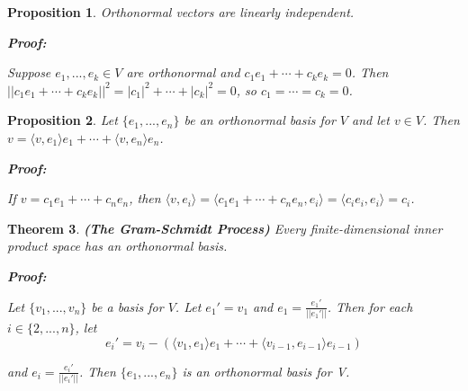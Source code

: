 \documentclass{article}
\theoremstyle{colontheorem}
\newtheorem{theorem}{Theorem}[section]
\newtheorem{proposition}[theorem]{Proposition}
\newenvironment{Theorem}
{
	\begin{mdframed}[backgroundcolor=TheoremOrange!10]
	\begin{theorem}
}
{
	\end{theorem}
	\end{mdframed}
	
	\vspace{.15in}
}
\newenvironment{Proposition}
{
	\begin{mdframed}[backgroundcolor=TheoremOrange!10]
	\begin{proposition}
}
{
	\end{proposition}
	\end{mdframed}
	
	\vspace{.15in}
}
\newenvironment{Proof}
{
	\begin{mdframed}[backgroundcolor=ProofPurple!10]
	\textbf{Proof:}%
}
{
	\end{mdframed}
	
	\vspace{.085in}
}
\begin{document}
\begin{Proposition}
	
	Orthonormal vectors are linearly independent.
	
	\begin{Proof}
		Suppose $e_1, ..., e_k \in V$ are orthonormal and $c_1 e_1 + \cdots + c_k e_k = 0$. Then $||c_1 e_1 + \cdots + c_k e_k||^2 = |c_1|^2 + \cdots + |c_k|^2 = 0$, so $c_1 = \cdots = c_k = 0$.
		
	\end{Proof}
	
\end{Proposition}



\begin{Proposition}
	
	Let $\{e_1, ..., e_n\}$ be an orthonormal basis for $V$ and let $v \in V$. Then $v = \langle v, e_1 \rangle e_1 + \cdots + \langle v, e_n \rangle e_n$.
	
	\begin{Proof}
		If $v = c_1 e_1 + \cdots + c_n e_n$, then $\langle v, e_i \rangle = \langle c_1 e_1 + \cdots + c_n e_n, e_i \rangle = \langle c_i e_i, e_i \rangle = c_i$.
		
	\end{Proof}
	
\end{Proposition}



\begin{Theorem}
	
	\textbf{(The Gram-Schmidt Process)} Every finite-dimensional inner product space has an orthonormal basis.
	
	\begin{Proof}
		Let $\{v_1, ..., v_n\}$ be a basis for $V$. Let $e_1' = v_1$ and $e_1 = \frac{e_1'}{||e_1'||}$. Then for each $i \in \{2, ..., n\}$, let
		$$
		e_i' = v_i - \left( \langle v_1, e_1 \rangle e_1 + \cdots + \langle v_{i-1}, e_{i-1} \rangle e_{i-1} \right)
		$$ 
		
		and $e_i = \frac{e_i'}{||e_i'||}$. Then $\{e_1, ..., e_n\}$ is an orthonormal basis for V.
		
	\end{Proof}
	
\end{Theorem}
\end{document}
